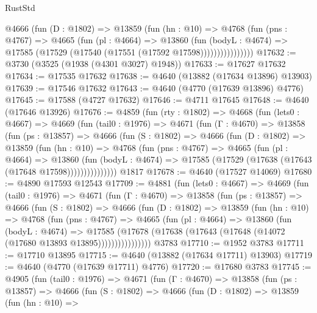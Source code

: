 \begin{lexlean}{RustStd}
\begin{coremodule}
                @4666
                  (fun (D : @1802) =>
                  @13859
                    (fun (hn : @10) =>
                    @4768
                      (fun (pns : @4767) =>
                      @4665
                        (fun (pl : @4664) =>
                        @13860
                          (fun (bodyL : @4674) =>
                          @17585 (@17529 (@17540 (@17551 (@17592 @17598))))))))))))))))
@17632 := @3730 (@3525 (@1938 (@4301 @3027) @1948))
@17633 := @17627 @17632
@17634 := @17535 @17632
@17638 := @4640 (@13882 (@17634 @13896) @13903)
@17639 := @17546 @17632
@17643 := @4640 (@4770 (@17639 @13896) @4776)
@17645 := @17588 (@4727 @17632)
@17646 := @4711 @17645
@17648 := @4640 (@17646 @13926)
@17676 := @4859
    (fun (rty : @1802) =>
    @4668
      (fun (lets0 : @4667) =>
      @4669
        (fun (tail0 : @1976) =>
        @4671
          (fun (Γ : @4670) =>
          @13858
            (fun (ps : @13857) =>
            @4666
              (fun (S : @1802) =>
              @4666
                (fun (D : @1802) =>
                @13859
                  (fun (hn : @10) =>
                  @4768
                    (fun (pns : @4767) =>
                    @4665
                      (fun (pl : @4664) =>
                      @13860
                        (fun (bodyL : @4674) =>
                        @17585 (@17529 (@17638 (@17643 (@17648 @17598)))))))))))))))
    @1817
@17678 := @4640 (@17527 @14069)
@17680 := @4890 @17593 @12543
@17709 := @4881
    (fun (lets0 : @4667) =>
    @4669
      (fun (tail0 : @1976) =>
      @4671
        (fun (Γ : @4670) =>
        @13858
          (fun (ps : @13857) =>
          @4666
            (fun (S : @1802) =>
            @4666
              (fun (D : @1802) =>
              @13859
                (fun (hn : @10) =>
                @4768
                  (fun (pns : @4767) =>
                  @4665
                    (fun (pl : @4664) =>
                    @13860
                      (fun (bodyL : @4674) =>
                      @17585
                        (@17678
                          (@17638 (@17643 (@17648 (@14072 (@17680 @13893 @13895))))))))))))))))
    @3783
@17710 := @1952 @3783
@17711 := @17710 @13895
@17715 := @4640 (@13882 (@17634 @17711) @13903)
@17719 := @4640 (@4770 (@17639 @17711) @4776)
@17720 := @17680 @3783
@17745 := @4905
    (fun (tail0 : @1976) =>
    @4671
      (fun (Γ : @4670) =>
      @13858
        (fun (ps : @13857) =>
        @4666
          (fun (S : @1802) =>
          @4666
            (fun (D : @1802) =>
            @13859
              (fun (hn : @10) =>

\end{coremodule}
\end{lexlean}
